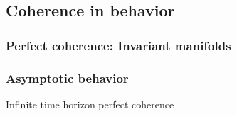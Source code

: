 \documentclass{article}
\theoremstyle{definition} \newtheorem{definition}{Definition}  \newtheorem{example}{Example}
\theoremstyle{remark} \newtheorem{remark}{Remark}
\newcounter{ct}
\begin{document}
%
%
%
%
%
%
%
%
%
%
%
%


\subsection{Coherence in behavior}
\subsubsection{Perfect coherence: Invariant manifolds}%


\subsubsection{Asymptotic behavior}\label{sec:asymptotic}
Infinite time horizon perfect coherence
\end{document}
